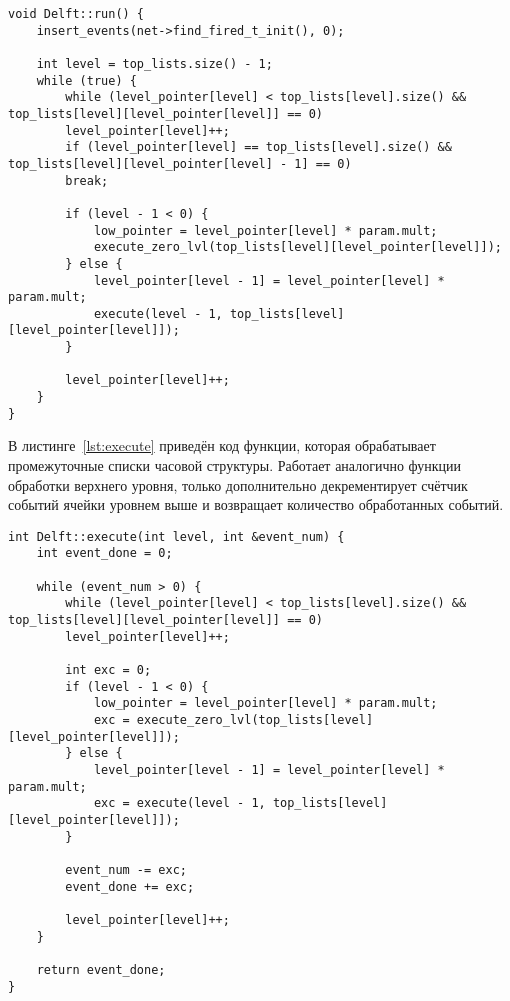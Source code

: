 \begin{center}
	\captionsetup{justification=raggedright,singlelinecheck=off}
	\begin{lstlisting}[label=lst:run,caption=Функция обработки верхнего списка,showstringspaces=false]
void Delft::run() {
	insert_events(net->find_fired_t_init(), 0);
	
	int level = top_lists.size() - 1;
	while (true) {
		while (level_pointer[level] < top_lists[level].size() && top_lists[level][level_pointer[level]] == 0)
		level_pointer[level]++;
		if (level_pointer[level] == top_lists[level].size() && top_lists[level][level_pointer[level] - 1] == 0)
		break;
		
		if (level - 1 < 0) {
			low_pointer = level_pointer[level] * param.mult;
			execute_zero_lvl(top_lists[level][level_pointer[level]]);
		} else {
			level_pointer[level - 1] = level_pointer[level] * param.mult;
			execute(level - 1, top_lists[level][level_pointer[level]]);
		}
		
		level_pointer[level]++;
	}
}	
	\end{lstlisting}
\end{center}
\FloatBarrier

В листинге~\ref{lst:execute} приведён код функции, которая обрабатывает промежуточные списки часовой структуры. Работает аналогично функции обработки верхнего уровня, только дополнительно декрементирует счётчик событий ячейки уровнем выше и возвращает количество обработанных событий.

\begin{center}
	\captionsetup{justification=raggedright,singlelinecheck=off}
	\begin{lstlisting}[label=lst:execute,caption=Функция обработки промежуточных списков,showstringspaces=false]
int Delft::execute(int level, int &event_num) {
	int event_done = 0;
	
	while (event_num > 0) {
		while (level_pointer[level] < top_lists[level].size() && top_lists[level][level_pointer[level]] == 0)
		level_pointer[level]++;
		
		int exc = 0;
		if (level - 1 < 0) {
			low_pointer = level_pointer[level] * param.mult;
			exc = execute_zero_lvl(top_lists[level][level_pointer[level]]);
		} else {
			level_pointer[level - 1] = level_pointer[level] * param.mult;
			exc = execute(level - 1, top_lists[level][level_pointer[level]]);
		}
		
		event_num -= exc;
		event_done += exc;
		
		level_pointer[level]++;
	}
	
	return event_done;
}		
	\end{lstlisting}
\end{center}
\FloatBarrier

